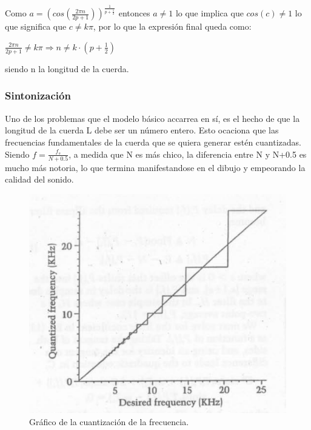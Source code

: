 \documentclass[../ASSD_TP2.tex]{subfiles}
\begin{document}
Como $a=(cos(\frac{2\pi n}{2p+1}))^{\frac{1}{p+\frac{1}{2}}}$ entonces
$a\neq1$ lo que implica que $cos(c)\neq1$ lo que significa que $c\neq k\pi$,
por lo que la expresión final queda como:
\begin{center}
$\frac{2\pi n}{2p+1}\neq k\pi\Rightarrow n\neq k\cdot(p+\frac{1}{2})$
\par\end{center}

siendo n la longitud de la cuerda.

\subsubsection{Sintonización}

Uno de los problemas que el modelo básico accarrea en sí, es el hecho
de que la longitud de la cuerda L debe ser un número entero. Esto
ocaciona que las frecuencias fundamentales de la cuerda que se quiera
generar estén cuantizadas. Siendo $f=\frac{f_{s}}{N+0.5}$, a medida
que N es más chico, la diferencia entre N y N+0.5 es mucho más notoria,
lo que termina manifestandose en el dibujo y empeorando la calidad
del sonido.

\begin{figure}[H]

\begin{centering}
\includegraphics[scale=0.6]{imagenes/grafico1}\caption{Gráfico de la cuantización de la frecuencia.}
\par\end{centering}
\end{figure}
\end{document}
